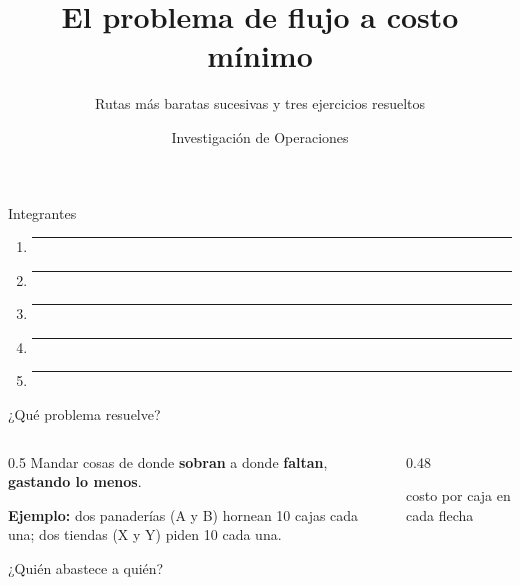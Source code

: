 \documentclass[aspectratio=169]{beamer}
\title{El problema de flujo a costo mínimo}
\subtitle{Rutas más baratas sucesivas y tres ejercicios resueltos}
\author{Investigación de Operaciones}
\institute{Asignación y flujo en redes}
\date{}
\begin{document}
\begin{frame}
  \titlepage
\end{frame}

\begin{frame}{Integrantes}
  \vspace{1.2em}
  \begin{enumerate}\setlength{\itemsep}{1.4em}
    \item \rule{0.7\textwidth}{0.4pt}
    \item \rule{0.7\textwidth}{0.4pt}
    \item \rule{0.7\textwidth}{0.4pt}
    \item \rule{0.7\textwidth}{0.4pt}
    \item \rule{0.7\textwidth}{0.4pt}
  \end{enumerate}
\end{frame}

\begin{frame}{¿Qué problema resuelve?}
  \begin{columns}[c]
    \begin{column}{0.5\textwidth}
      Mandar cosas de donde \textbf{sobran} a donde \textbf{faltan}, \textbf{gastando lo menos}.
      \bigskip

      \textbf{Ejemplo:} dos panaderías (A y B) hornean 10 cajas cada una; dos tiendas (X y Y) piden 10 cada una.
      \bigskip

      ¿Quién abastece a quién?
    \end{column}
    \begin{column}{0.48\textwidth}\centering

      \small costo por caja en cada flecha
    \end{column}
  \end{columns}
\end{frame}
\end{document}
